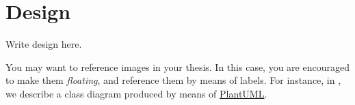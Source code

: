 \chapter{Design} %
\label{chap:design}

Write design here.


You may want to reference images in your thesis.
%
In this case, you are encouraged to make them \emph{floating}, and reference them by means of labels.
%
For instance, in , we describe a class diagram produced by means of \href{http://plantuml.com}{PlantUML}.